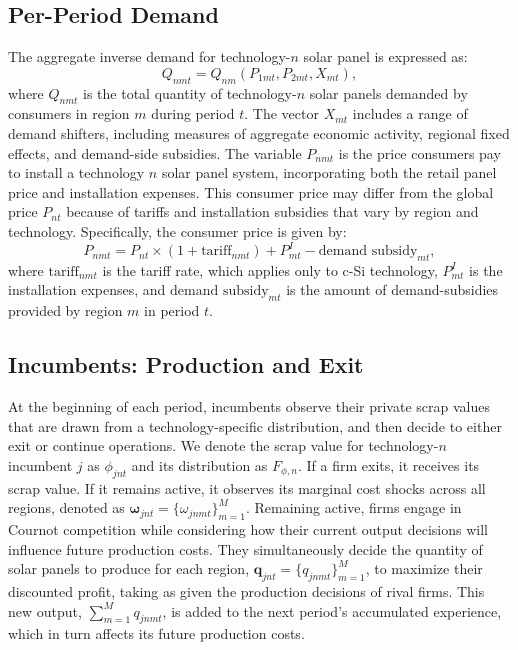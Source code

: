 \documentclass[12pt, letter]{article}
\begin{document}
\subsection{Per-Period Demand}

The aggregate inverse demand for technology-$n$ solar panel is expressed as:
\begin{equation}
Q_{nmt}=Q_{nm}(P_{1mt},P_{2mt},X_{mt}), \label{eq:model_demand}
\end{equation}
where $Q_{nmt}$ is the total quantity of technology-$n$ solar panels demanded by consumers in region $m$ during period $t$. The vector $X_{mt}$ includes a range of demand shifters, including measures of aggregate economic activity, regional fixed effects, and demand-side subsidies. The variable $P_{nmt}$ is the price consumers pay to install a technology $n$ solar panel system, incorporating both the retail panel price and installation expenses. This consumer price may differ from the global price $P_{nt}$ because of tariffs and installation subsidies that vary by region and technology. Specifically, the consumer price is given by:
\[P_{nmt} = P_{nt}\times (1 + \text{tariff}_{nmt}) + P^{I}_{mt} - \text{demand subsidy}_{mt},\]
where $\text{tariff}_{nmt}$ is the tariff rate, which applies only to c-Si technology, $P^{I}_{mt}$ is the installation expenses, and $\text{demand subsidy}_{mt}$ is the amount of demand-subsidies provided by region $m$ in period $t$.


\subsection{Incumbents: Production and Exit}
At the beginning of each period, incumbents observe their private scrap values that are drawn from a technology-specific distribution, and then decide to either exit or continue operations. We denote the scrap value for technology-$n$ incumbent $j$ as $\phi_{jnt}$ and its distribution as $F_{\phi,n}$. If a firm exits, it receives its scrap value. If it remains active, it observes its marginal cost shocks across all regions, denoted as $\mathbf{\omega}_{jnt} =\{\omega_{jnmt}\}_{m=1}^M$. Remaining active, firms engage in Cournot competition while considering how their current output decisions will influence future production costs. They simultaneously decide the quantity of solar panels to produce for each region, $\mathbf{q}_{jnt} = \{q_{jnmt}\}_{m=1}^M$, to maximize their discounted profit, taking as given the production decisions of rival firms. This new output, $\sum_{m=1}^M q_{jnmt}$, is added to the next period's accumulated experience, which in turn affects its future production costs.
\end{document}

